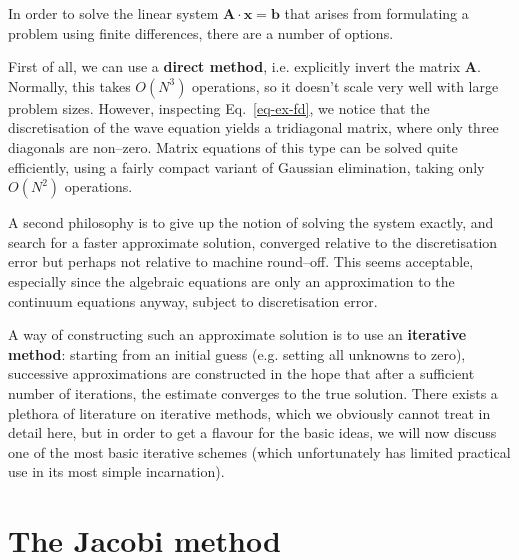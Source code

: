 In order to solve the linear system ${\mathbf A}\cdot{\mathbf x}={\mathbf b}$ that arises from formulating a problem using finite differences, there are a number of options.

First of all, we can use a \textbf{direct method}, i.e. explicitly invert the matrix ${\mathbf A}$. Normally, this takes $O(N^3)$ operations, so it doesn't scale very well with large problem sizes. However, inspecting Eq.~\ref{eq-ex-fd}, we notice that the discretisation of the wave equation yields a tridiagonal matrix, where only three diagonals are non--zero. Matrix equations of this type can be solved quite efficiently, using a fairly compact variant of Gaussian elimination, taking only $O(N^2)$ operations.

A second philosophy is to give up the notion of solving the system exactly, and search for a faster approximate solution, converged relative to the discretisation error but perhaps not relative to machine round--off. This seems acceptable, especially since the algebraic equations are only an approximation to the continuum equations anyway, subject to discretisation error.

A way of constructing such an approximate solution is to use an \textbf{iterative method}: starting from an initial guess (e.g. setting all unknowns to zero), successive approximations  are constructed in the hope that after a sufficient number of iterations, the estimate converges to the true solution. There exists a plethora of literature on iterative methods, which we obviously cannot treat in detail here, but in order to get a flavour for the basic ideas, we will now discuss one of the most basic iterative schemes (which unfortunately has limited practical use in its most simple incarnation).


\pagebreak

\section{The Jacobi method}


